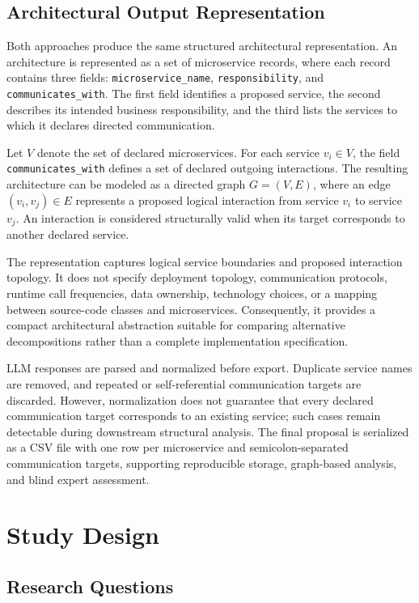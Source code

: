 \documentclass[acmsmall,screen,anonymous,review]{acmart}
\begin{document}
\subsection{Architectural Output Representation}

Both approaches produce the same structured architectural representation. An architecture is represented as a set of microservice records, where each record contains three fields: \texttt{microservice\_name}, \texttt{responsibility}, and \texttt{communicates\_with}. The first field identifies a proposed service, the second describes its intended business responsibility, and the third lists the services to which it declares directed communication.

Let $V$ denote the set of declared microservices. For each service $v_i \in V$, the field \texttt{communicates\_with} defines a set of declared outgoing interactions. The resulting architecture can be modeled as a directed graph $G=(V,E)$, where an edge $(v_i,v_j) \in E$ represents a proposed logical interaction from service $v_i$ to service $v_j$. An interaction is considered structurally valid when its target corresponds to another declared service.

The representation captures logical service boundaries and proposed interaction topology. It does not specify deployment topology, communication protocols, runtime call frequencies, data ownership, technology choices, or a mapping between source-code classes and microservices. Consequently, it provides a compact architectural abstraction suitable for comparing alternative decompositions rather than a complete implementation specification.

LLM responses are parsed and normalized before export. Duplicate service names are removed, and repeated or self-referential communication targets are discarded. However, normalization does not guarantee that every declared communication target corresponds to an existing service; such cases remain detectable during downstream structural analysis. The final proposal is serialized as a CSV file with one row per microservice and semicolon-separated communication targets, supporting reproducible storage, graph-based analysis, and blind expert assessment.

\section{Study Design}

\subsection{Research Questions}
\end{document}
